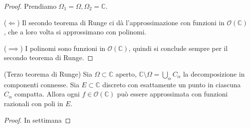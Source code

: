 \begin{proof}
  Prendiamo $\Omega_1=\Omega, \Omega_2=\mathbb{C}$.

  ($\Leftarrow$) Il secondo teorema di Runge ci dà l'approssimazione con funzioni in $\mathcal{O}(\mathbb{C})$, che a loro volta si approssimano con polinomi.

  ($\implies$) I polinomi sono funzioni in $\mathcal{O}(\mathbb{C})$, quindi si conclude sempre per il secondo teorema di Runge.
\end{proof}

\begin{thm}
  (Terzo teorema di Runge) Sia $\Omega \subset \mathbb{C}$ aperto, $\displaystyle \mathbb{C}\setminus \Omega=\bigcup_{\alpha}C_{\alpha}$ la decomposizione in componenti connesse. Sia $E \subset \mathbb{C}$ discreto con esattamente un punto in ciascuna $C_{\alpha}$ compatta. Allora ogni $f \in \mathcal{O}(\mathbb{C})$ può essere approssimata con funzioni razionali con poli in $E$.
\end{thm}

\begin{proof}
  In settimana
\end{proof}
